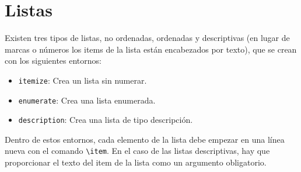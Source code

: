 \documentclass[
  a4paper,
]{scrreport}
\providecommand{\tightlist}{%
  \setlength{\itemsep}{0pt}\setlength{\parskip}{0pt}}\usepackage{longtable,booktabs,array}
\theoremstyle{definition}
\theoremstyle{remark}
\begin{document}

\chapter{Listas}\label{listas}

Existen tres tipos de listas, no ordenadas, ordenadas y descriptivas (en
lugar de marcas o números los items de la lista están encabezados por
texto), que se crean con los siguientes entornos:

\begin{itemize}
\tightlist
\item
  \texttt{itemize}: Crea un lista sin numerar.
\item
  \texttt{enumerate}: Crea una lista enumerada.
\item
  \texttt{description}: Crea una lista de tipo descripción.
\end{itemize}

Dentro de estos entornos, cada elemento de la lista debe empezar en una
línea nueva con el comando \texttt{\textbackslash{}item}. En el caso de
las listas descriptivas, hay que proporcionar el texto del item de la
lista como un argumento obligatorio.
\end{document}

